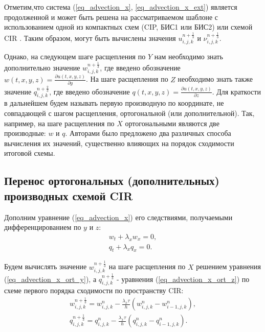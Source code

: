 \documentclass[11pt]{article}
\begin{document}
Отметим,что система (\ref{eq_advection_x}, \ref{eq_advection_x_ext}) является продолженной и может быть решена на рассматриваемом шаблоне с использованием одной из компактных схем (CIP, БИС1 или БИС2) \cite{Khokhlov1D2014} или схемой CIR \cite{Courant1952}.
Таким образом, могут быть вычислены значения $u^{n + \frac{1}{3}}_{i, j, k}$ и $\nu^{n + \frac{1}{3}}_{i, j, k}$.

Однако, на следующем шаге расщепления по $Y$ нам необходимо знать дополнительно значение $w^{n + \frac{1}{3}}_{i, j, k}$, где введено обозначение $w(t, x, y, z) = \frac{\partial u(t, x, y, z)}{\partial y}$.
На шаге расщепления по $Z$ необходимо знать также значение $q^{n + \frac{2}{3}}_{i, j, k}$, где введено обозначение $q(t, x, y, z) = \frac{\partial u(t, x, y, z)}{\partial z}$.
Для краткости в дальнейшем будем называть первую производную по координате, не совпадающей с шагом расщепления, ортогональной (или дополнительной).
Так, например, на шаге расщепления по $X$ ортогональными являются две производные: $w$ и $q$.
Авторами было предложено два различных способа вычисления их значений, существенно влияющих на порядок сходимости итоговой схемы.

\subsection{Перенос ортогональных (дополнительных) производных схемой CIR}

Дополним уравнение (\ref{eq_advection_x}) его следствиями, получаемыми дифференцированием по $y$ и $z$:
\begin{eqnarray}
\label{eq_advection_x_ort_y}
w_t + \lambda_x w_x = 0, \\
\label{eq_advection_x_ort_z}
q_t + \lambda_x q_x = 0.
\end{eqnarray}

Будем вычислять значение $w^{n + \frac{1}{3}}_{i, j, k}$ на шаге расщепления по $X$ решением уравнения (\ref{eq_advection_x_ort_y}), а $q^{n + \frac{1}{3}}_{i, j, k}$ - уравнения (\ref{eq_advection_x_ort_z}) по схеме первого порядка сходимости по пространству CIR:
\begin{eqnarray}
\label{eq_advection_x_ort_y_g}
w^{n + \frac{1}{3}}_{i, j, k} = w^{n}_{i, j, k} - \frac{\lambda_x\tau}{h}(w^{n}_{i, j, k} - w^{n}_{i - 1, j, k}), \\
\label{eq_advection_x_ort_z_g}
q^{n + \frac{1}{3}}_{i, j, k} = q^{n}_{i, j, k} - \frac{\lambda_x\tau}{h}(q^{n}_{i, j, k} - q^{n}_{i - 1, j, k}).
\end{eqnarray}
\end{document}
